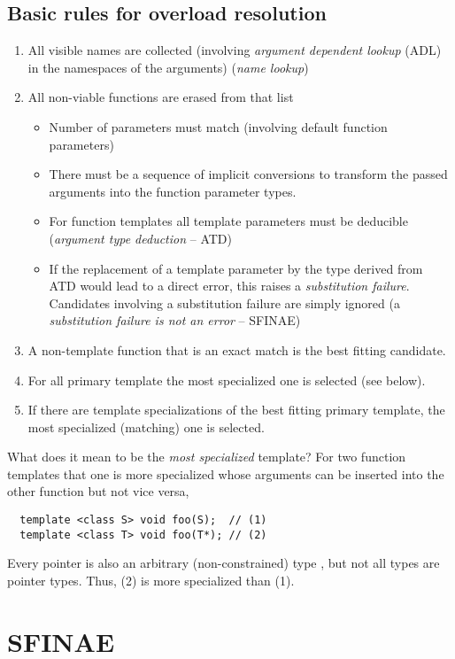 \subsection{Basic rules for overload resolution}
\begin{enumerate}
  \item All visible names are collected (involving \emph{argument dependent lookup} (ADL) in the namespaces of the arguments) (\emph{name lookup})
  \item All non-viable functions are erased from that list\begin{itemize}
    \item Number of parameters must match (involving default function parameters)
    \item There must be a sequence of implicit conversions to transform the passed arguments into the function parameter types.
    \item For function templates all template parameters must be deducible (\emph{argument type deduction} -- ATD)
    \item If the replacement of a template parameter by the type derived from ATD would lead to a direct error, this raises a \emph{substitution failure}.
          Candidates involving a substitution failure are simply ignored (a \emph{substitution failure is not an error} -- SFINAE)
    \end{itemize}
  \item A non-template function that is an exact match is the best fitting candidate.
  \item For all primary template the most specialized one is selected (see below).
  \item If there are template specializations of the best fitting primary template, the most specialized (matching) one is selected.
\end{enumerate}

What does it mean to be the \textit{most specialized} template? For two function templates that one is more specialized whose arguments can be inserted into the other function but not vice versa, \eg
%
\begin{verbatim}
  template <class S> void foo(S);  // (1)
  template <class T> void foo(T*); // (2)
\end{verbatim}
%
Every pointer  is also an arbitrary (non-constrained) type , but not all types  are pointer types. Thus, (2) is more specialized than (1).

\section{SFINAE}
\label{sec:sfinae}

